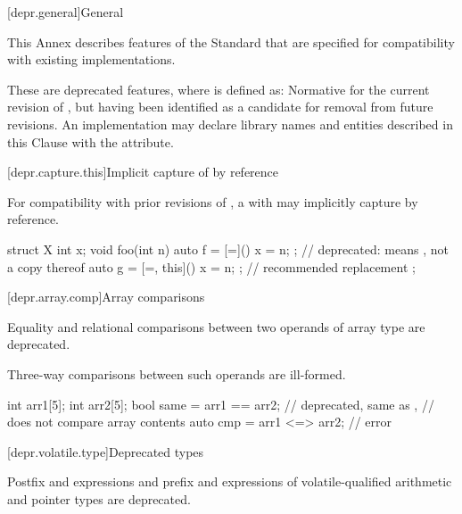 
[depr.general]{General}

\pnum
This Annex describes features of the \Cpp{} Standard that are specified for compatibility with
existing implementations.

\pnum
These are deprecated features, where
is defined as:
Normative for the current revision of \Cpp{},
but having been identified as a candidate for removal from future revisions.
An implementation may declare library names and entities described in this Clause with the
 attribute.

[depr.capture.this]{Implicit capture of  by reference}

\pnum
For compatibility with prior revisions of \Cpp{},
a  with 
\tcode{=} may implicitly capture
 by reference.
\begin{example}
\begin{codeblock}
struct X {
  int x;
  void foo(int n) {
    auto f = [=]() { x = n; };          // deprecated:  means , not a copy thereof
    auto g = [=, this]() { x = n; };    // recommended replacement
  }
};
\end{codeblock}
\end{example}

[depr.array.comp]{Array comparisons}

\pnum
Equality and relational comparisons
between two operands of array type
are deprecated.
\begin{note}
Three-way comparisons between such operands are ill-formed.
\end{note}
\begin{example}
\begin{codeblock}
int arr1[5];
int arr2[5];
bool same = arr1 == arr2;       // deprecated, same as ,
                                // does not compare array contents
auto cmp = arr1 <=> arr2;       // error
\end{codeblock}
\end{example}

[depr.volatile.type]{Deprecated  types}

\pnum
Postfix \tcode{++} and \tcode{--} expressions and
prefix \tcode{++} and \tcode{--} expressions
of volatile-qualified arithmetic and pointer types are deprecated.


